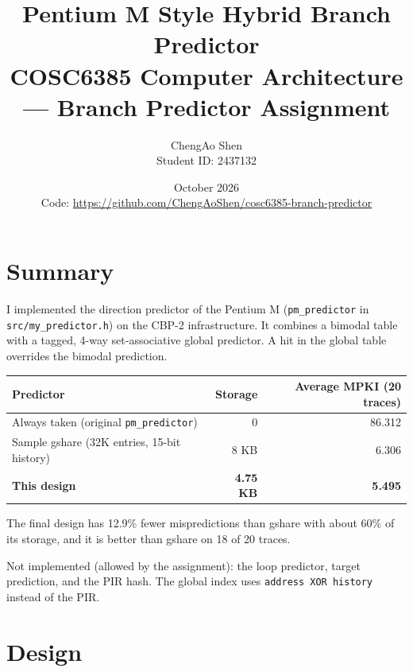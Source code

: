 \documentclass[11pt]{article}
\title{Pentium M Style Hybrid Branch Predictor\\\large COSC6385 Computer Architecture --- Branch Predictor Assignment}
\author{ChengAo Shen \\ \small Student ID: 2437132}
\date{October 2026 \\ \small Code: \url{https://github.com/ChengAoShen/cosc6385-branch-predictor}}
\begin{document}
\maketitle

\section{Summary}

I implemented the direction predictor of the Pentium M (\texttt{pm\_predictor} in
\texttt{src/my\_predictor.h}) on the CBP-2 infrastructure. It combines a bimodal
table with a tagged, 4-way set-associative global predictor. A hit in the global
table overrides the bimodal prediction.

\begin{table}[H]
\centering
\begin{tabular}{lrr}
\toprule
Predictor & Storage & Average MPKI (20 traces) \\
\midrule
Always taken (original \texttt{pm\_predictor}) & 0 & 86.312 \\
Sample gshare (32K entries, 15-bit history) & 8 KB & 6.306 \\
\textbf{This design} & \textbf{4.75 KB} & \textbf{5.495} \\
\bottomrule
\end{tabular}
\end{table}

The final design has 12.9\% fewer mispredictions than gshare with about 60\% of
its storage, and it is better than gshare on 18 of 20 traces.

Not implemented (allowed by the assignment): the loop predictor, target
prediction, and the PIR hash. The global index uses
\texttt{address XOR history} instead of the PIR.

\section{Design}
\end{document}
